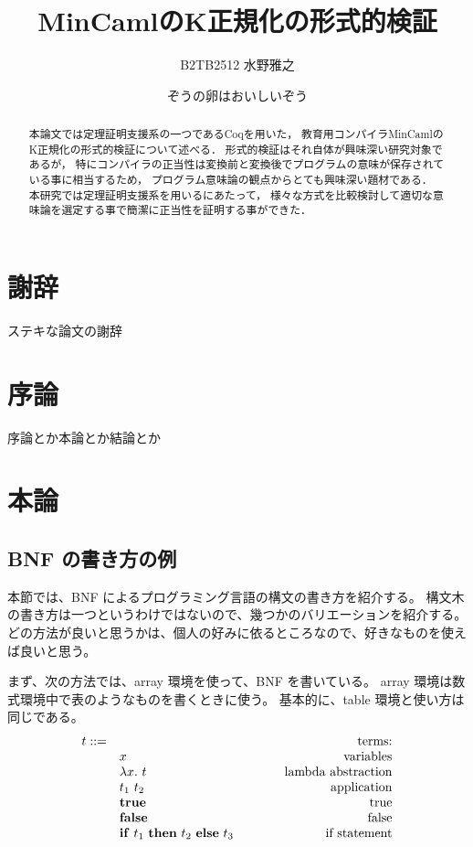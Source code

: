 \documentclass{sumiilab-paper}
\title{MinCamlのK正規化の形式的検証}
\author{B2TB2512 水野雅之}
\institute{東北大学 工学部\\情報知能システム総合学科}%
\date{ぞうの卵はおいしいぞう}
\newcommand{\keyword}[1]{\mathbf{#1}}
\newcommand{\TRUE}{\keyword{true}}
\newcommand{\FALSE}{\keyword{false}}
\newcommand{\IF}{\keyword{if}}
\newcommand{\THEN}{\keyword{then}}
\newcommand{\ELSE}{\keyword{else}}
\begin{document}
\maketitle

\begin{abstract}
本論文では定理証明支援系の一つであるCoqを用いた，
教育用コンパイラMinCamlのK正規化の形式的検証について述べる．
形式的検証はそれ自体が興味深い研究対象であるが，
特にコンパイラの正当性は変換前と変換後でプログラムの意味が保存されている事に相当するため，
プログラム意味論の観点からとても興味深い題材である．
本研究では定理証明支援系を用いるにあたって，
様々な方式を比較検討して適切な意味論を選定する事で簡潔に正当性を証明する事ができた．
\end{abstract}

\chapter*{謝辞}

ステキな論文の謝辞

\tableofcontents


\chapter{序論}

序論とか本論とか結論とか \cite{Pierce:TypeSystems}

\chapter{本論}

\section{BNF の書き方の例}

本節では、BNF によるプログラミング言語の構文の書き方を紹介する。
構文木の書き方は一つというわけではないので、幾つかのバリエーションを紹介する。
どの方法が良いと思うかは、個人の好みに依るところなので、好きなものを使えば良いと思う。

まず、次の方法では、array 環境を使って、BNF を書いている。
array 環境は数式環境中で表のようなものを書くときに使う。
基本的に、table 環境と使い方は同じである。
\[
\begin{array}{rl@{\qquad\qquad}r}
  t ::=
  & & \mbox{terms:} \\
  & x & \mbox{variables} \\
  & \lambda x.~t & \mbox{lambda abstraction} \\
  & t_1~t_2 & \mbox{application} \\
  & \TRUE & \mbox{true} \\
  & \FALSE & \mbox{false} \\
  & \IF~t_1~\THEN~t_2~\ELSE~t_3 & \mbox{if statement}
\end{array}
\]
\end{document}
